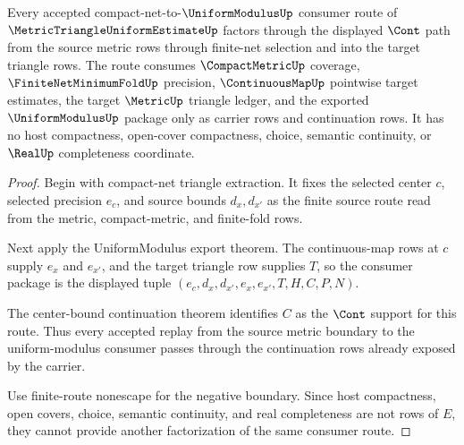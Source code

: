 \begin{theorem}
\label{thm:metric-triangle-uniform-estimate-cont-route-scope}
Every accepted compact-net-to-$\UniformModulusUp$ consumer route of $\MetricTriangleUniformEstimateUp$ factors through the displayed $\Cont$ path from the source metric rows through finite-net selection and into the target triangle rows. The route consumes $\CompactMetricUp$ coverage, $\FiniteNetMinimumFoldUp$ precision, $\ContinuousMapUp$ pointwise target estimates, the target $\MetricUp$ triangle ledger, and the exported $\UniformModulusUp$ package only as carrier rows and continuation rows. It has no host compactness, open-cover compactness, choice, semantic continuity, or $\RealUp$ completeness coordinate.
\end{theorem}
\begin{proof}
Begin with compact-net triangle extraction. It fixes the selected center $c$, selected precision $e_c$, and source bounds $d_x,d_{x'}$ as the finite source route read from the metric, compact-metric, and finite-fold rows.

Next apply the UniformModulus export theorem. The continuous-map rows at $c$ supply $e_x$ and $e_{x'}$, and the target triangle row supplies $T$, so the consumer package is the displayed tuple $(e_c,d_x,d_{x'},e_x,e_{x'},T,H,C,P,N)$.

The center-bound continuation theorem identifies $C$ as the $\Cont$ support for this route. Thus every accepted replay from the source metric boundary to the uniform-modulus consumer passes through the continuation rows already exposed by the carrier.

Use finite-route nonescape for the negative boundary. Since host compactness, open covers, choice, semantic continuity, and real completeness are not rows of $E$, they cannot provide another factorization of the same consumer route.
\end{proof}

